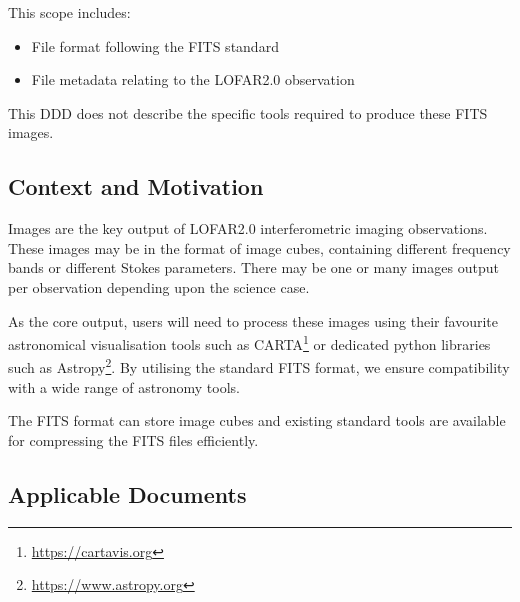 \documentclass[a4paper,10pt,bibtotoc]{scrartcl}
\begin{document}
This scope includes:
\begin{itemize}
    \item File format following the FITS standard
    \item File metadata relating to the LOFAR2.0 observation
\end{itemize}

This DDD does not describe the specific tools required to produce these FITS images.


\subsection{Context and Motivation}
\label{sec:context and motivation}

Images are the key output of LOFAR2.0 interferometric imaging observations. These images may be in the format of image cubes, containing different frequency bands or different Stokes parameters. There may be one or many images output per observation depending upon the science case.

As the core output, users will need to process these images using their favourite astronomical visualisation tools such as CARTA\footnote{\url{https://cartavis.org}} or dedicated python libraries such as Astropy\footnote{\url{https://www.astropy.org}}. By utilising the standard FITS format, we ensure compatibility with a wide range of astronomy tools.

The FITS format can store image cubes and existing standard tools are available for compressing the FITS files efficiently.


\subsection{Applicable Documents}


\end{document}
